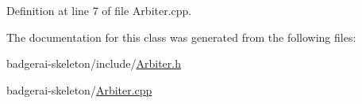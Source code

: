 Definition at line 7 of file Arbiter.\-cpp.


\begin{DoxyCode}
{
}
\end{DoxyCode}


The documentation for this class was generated from the following files\-:\begin{DoxyCompactItemize}
\item 
badgerai-\/skeleton/include/\hyperlink{Arbiter_8h}{Arbiter.\-h}\item 
badgerai-\/skeleton/\hyperlink{Arbiter_8cpp}{Arbiter.\-cpp}\end{DoxyCompactItemize}
